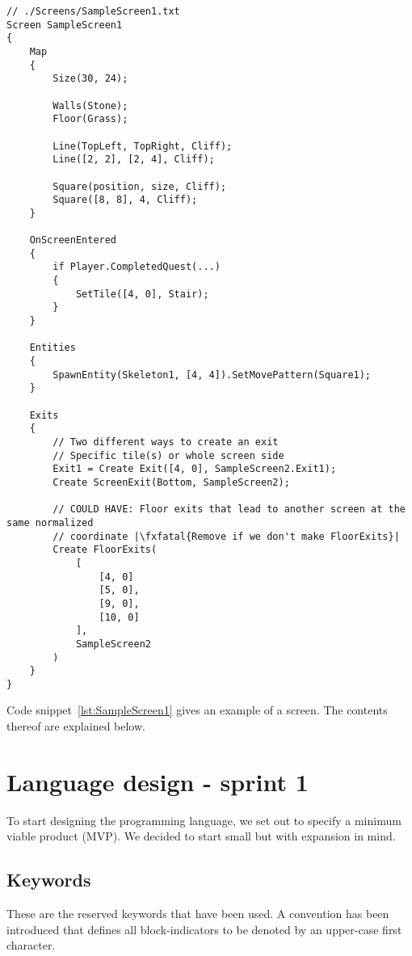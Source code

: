 \begin{lstlisting}[caption={Example screen}, label={lst:SampleScreen1},escapechar=|]
// ./Screens/SampleScreen1.txt
Screen SampleScreen1 
{
    Map 
    {
        Size(30, 24);

        Walls(Stone); 
        Floor(Grass);

        Line(TopLeft, TopRight, Cliff);
        Line([2, 2], [2, 4], Cliff);

        Square(position, size, Cliff);
        Square([8, 8], 4, Cliff);
    }

    OnScreenEntered
    {
        if Player.CompletedQuest(...) 
        {
            SetTile([4, 0], Stair);
        }
    }

    Entities
    {
        SpawnEntity(Skeleton1, [4, 4]).SetMovePattern(Square1);
    }
    
    Exits 
    {
        // Two different ways to create an exit
        // Specific tile(s) or whole screen side
        Exit1 = Create Exit([4, 0], SampleScreen2.Exit1);
        Create ScreenExit(Bottom, SampleScreen2);
    
        // COULD HAVE: Floor exits that lead to another screen at the same normalized 
        // coordinate |\fxfatal{Remove if we don't make FloorExits}|
        Create FloorExits(  
            [ 
                [4, 0] 
                [5, 0], 
                [9, 0], 
                [10, 0] 
            ],
            SampleScreen2
        )
    }
}
\end{lstlisting}

Code snippet~\ref{lst:SampleScreen1} gives an example of a screen. The contents thereof are explained below.

\section{Language design - sprint 1}

To start designing the programming language, we set out to specify a minimum viable product (MVP). We decided to start small but with expansion in mind.

\subsection{Keywords}
These are the reserved keywords that have been used.  A convention has been introduced that defines all block-indicators to be denoted by an upper-case first character.

